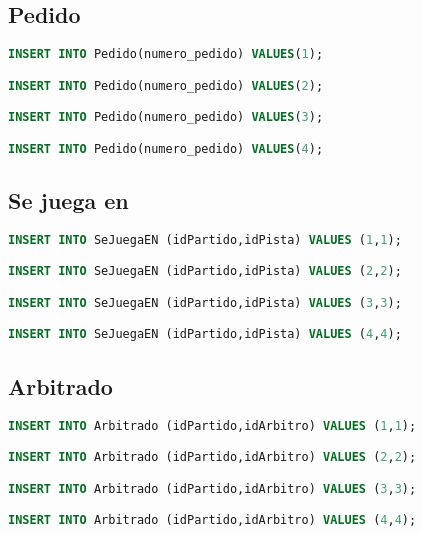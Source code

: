 \subsection{Pedido}
\begin{lstlisting}[language=sql]
INSERT INTO Pedido(numero_pedido) VALUES(1);

INSERT INTO Pedido(numero_pedido) VALUES(2);

INSERT INTO Pedido(numero_pedido) VALUES(3);

INSERT INTO Pedido(numero_pedido) VALUES(4);
\end{lstlisting}

\subsection{Se juega en}
\begin{lstlisting}[language=sql]
INSERT INTO SeJuegaEN (idPartido,idPista) VALUES (1,1);

INSERT INTO SeJuegaEN (idPartido,idPista) VALUES (2,2);

INSERT INTO SeJuegaEN (idPartido,idPista) VALUES (3,3);

INSERT INTO SeJuegaEN (idPartido,idPista) VALUES (4,4);
\end{lstlisting}

\subsection{Arbitrado}
\begin{lstlisting}[language=sql]
INSERT INTO Arbitrado (idPartido,idArbitro) VALUES (1,1);

INSERT INTO Arbitrado (idPartido,idArbitro) VALUES (2,2);

INSERT INTO Arbitrado (idPartido,idArbitro) VALUES (3,3);

INSERT INTO Arbitrado (idPartido,idArbitro) VALUES (4,4);
\end{lstlisting}
\pagebreak
